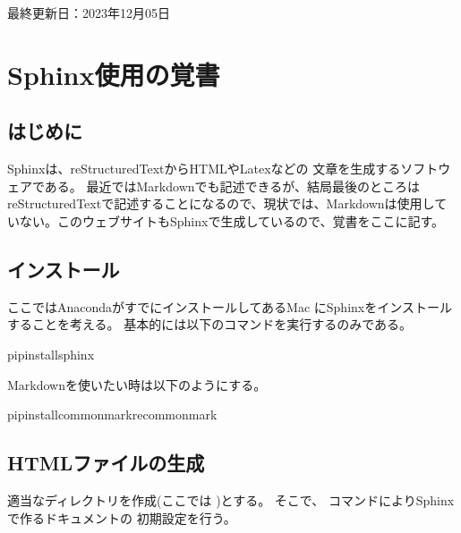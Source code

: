 \documentclass[letterpaper,10pt,dvipdfmx,report]{sphinxmanual}
\begin{document}
\sphinxAtStartPar
最終更新日：2023年12月05日

\sphinxstepscope


\chapter{Sphinx使用の覚書}
\label{\detokenize{sphinx:sphinx}}\label{\detokenize{sphinx::doc}}

\section{はじめに}
\label{\detokenize{sphinx:id1}}
\sphinxAtStartPar
Sphinxは、reStructuredTextからHTMLやLatexなどの
文章を生成するソフトウェアである。
最近ではMarkdownでも記述できるが、結局最後のところはreStructuredTextで記述することになるので、現状では、Markdownは使用していない。このウェブサイトもSphinxで生成しているので、覚書をここに記す。


\section{インストール}
\label{\detokenize{sphinx:id3}}
\sphinxAtStartPar
ここではAnacondaがすでにインストールしてあるMac
にSphinxをインストールすることを考える。
基本的には以下のコマンドを実行するのみである。

\begin{sphinxVerbatim}[commandchars=\\\{\}]
pipinstallsphinx
\end{sphinxVerbatim}

\sphinxAtStartPar
Markdownを使いたい時は以下のようにする。

\begin{sphinxVerbatim}[commandchars=\\\{\}]
pipinstallcommonmarkrecommonmark
\end{sphinxVerbatim}


\section{HTMLファイルの生成}
\label{\detokenize{sphinx:html}}
\sphinxAtStartPar
適当なディレクトリを作成(ここでは  )とする。
そこで、  コマンドによりSphinxで作るドキュメントの
初期設定を行う。
\end{document}
